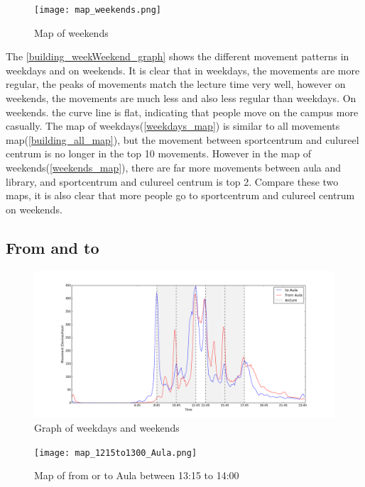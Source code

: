 \begin{figure}[H]
	\centering
	\texttt{[image: map\_weekends.png]}
	\captionsetup{justification=centering}
	\caption{Map of weekends}
	\label{weekends_map}
\end{figure}
The \autoref{building_weekWeekend_graph} shows the different movement patterns in weekdays and on weekends. It is clear that in weekdays, the movements are more regular, the peaks of movements match the lecture time very well, however on weekends, the movements are much less and also less regular than weekdays. On weekends. the curve line is flat, indicating that people move on the campus more casually.
The map of weekdays(\autoref{weekdays_map}) is similar to all movements map(\autoref{building_all_map}), but the movement between sportcentrum and culureel centrum is no longer in the top 10 movements. However in the map of weekends(\autoref{weekends_map}), there are far more movements between aula and library, and sportcentrum and culureel centrum is top 2. Compare these two maps, it is also clear that more people go to sportcentrum and culureel centrum on weekends.

\subsection{From and to}\label{chapter9fromto}
\begin{figure}[H]
	\centering
	\includegraphics[scale=0.3]{building_fromTo_aulaGraph.png}
	\captionsetup{justification=centering}
	\caption{Graph of weekdays and weekends}
	\label{building_weekWeekend_graph}
\end{figure}


\begin{figure}[H]
	\centering
	\texttt{[image: map\_1215to1300\_Aula.png]}
	\captionsetup{justification=centering}
	\caption{Map of from or to Aula between 13:15 to 14:00}
	\label{12151300_map}
\end{figure}

